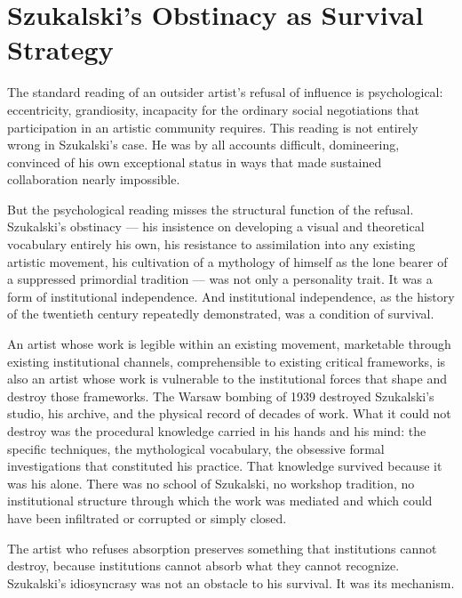\documentclass[11pt, a4paper]{article}
\theoremstyle{named}
\begin{document}
\section{Szukalski's Obstinacy as Survival Strategy}

The standard reading of an outsider artist's refusal of influence is
psychological: eccentricity, grandiosity, incapacity for the ordinary
social negotiations that participation in an artistic community
requires. This reading is not entirely wrong in Szukalski's case.
He was by all accounts difficult, domineering, convinced of his own
exceptional status in ways that made sustained collaboration nearly
impossible.

But the psychological reading misses the structural function of the
refusal. Szukalski's obstinacy — his insistence on developing a
visual and theoretical vocabulary entirely his own, his resistance to
assimilation into any existing artistic movement, his cultivation of
a mythology of himself as the lone bearer of a suppressed primordial
tradition — was not only a personality trait. It was a form of
institutional independence. And institutional independence, as the
history of the twentieth century repeatedly demonstrated, was a
condition of survival.

An artist whose work is legible within an existing movement,
marketable through existing institutional channels, comprehensible to
existing critical frameworks, is also an artist whose work is
vulnerable to the institutional forces that shape and destroy those
frameworks. The Warsaw bombing of 1939 destroyed Szukalski's studio,
his archive, and the physical record of decades of work. What it could
not destroy was the procedural knowledge carried in his hands and his
mind: the specific techniques, the mythological vocabulary, the
obsessive formal investigations that constituted his practice. That
knowledge survived because it was his alone. There was no school of
Szukalski, no workshop tradition, no institutional structure through
which the work was mediated and which could have been infiltrated or
corrupted or simply closed.

\begin{keybox}
The artist who refuses absorption preserves something that institutions
cannot destroy, because institutions cannot absorb what they cannot
recognize. Szukalski's idiosyncrasy was not an obstacle to his
survival. It was its mechanism.
\end{keybox}
\end{document}
